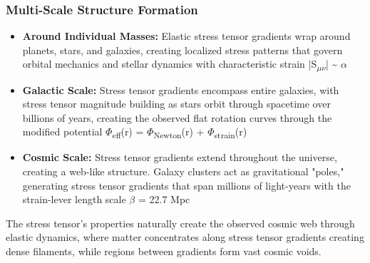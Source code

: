 \documentclass[11pt,a4paper]{article}
\begin{document}
\subsubsection{Multi-Scale Structure Formation}
\begin{itemize}
  \item \textbf{Around Individual Masses:} Elastic stress tensor gradients wrap around planets, stars, and galaxies, creating localized stress patterns that govern orbital mechanics and stellar dynamics with characteristic strain |S\textsubscript{$\mu$$\nu$}| \~{} $\alpha$
  \item \textbf{Galactic Scale:} Stress tensor gradients encompass entire galaxies, with stress tensor magnitude building as stars orbit through spacetime over billions of years, creating the observed flat rotation curves through the modified potential $\Phi$\textsubscript{eff}(r) = $\Phi$\textsubscript{Newton}(r) + $\Phi$\textsubscript{strain}(r)
  \item \textbf{Cosmic Scale:} Stress tensor gradients extend throughout the universe, creating a web-like structure. Galaxy clusters act as gravitational "poles," generating stress tensor gradients that span millions of light-years with the strain-lever length scale $\beta$ = 22.7 Mpc
\end{itemize}

The stress tensor's properties naturally create the observed cosmic web through elastic dynamics, where matter concentrates along stress tensor gradients creating dense filaments, while regions between gradients form vast cosmic voids.
\end{document}
